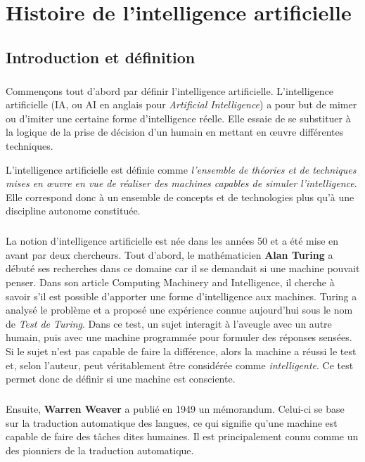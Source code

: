 \section{Histoire de l'intelligence artificielle}
\subsection{Introduction et définition}

\subparagraph{}
Commençons tout d’abord par définir l’intelligence artificielle. L'intelligence artificielle (IA, ou AI en anglais pour \textit{Artificial Intelligence}) a pour but de mimer ou d’imiter une certaine forme d’intelligence réelle. Elle essaie de se substituer à la logique de la prise de décision d’un humain en mettant en œuvre différentes techniques.

L'intelligence artificielle est définie comme \textit{l'ensemble de théories et de techniques mises en œuvre en vue de réaliser des machines capables de simuler l'intelligence}. 
Elle correspond donc à un ensemble de concepts et de technologies plus qu'à une discipline autonome constituée.

\subparagraph{}
La notion d’intelligence artificielle est née dans les années 50 et a été mise en avant par deux chercheurs.
Tout d’abord, le mathématicien \textbf{Alan Turing} a débuté ses recherches dans ce domaine car il se demandait si une machine pouvait penser.
Dans son article Computing Machinery and Intelligence, il cherche à savoir s’il est possible d’apporter une forme d'intelligence aux machines.
Turing a analysé le problème et a proposé une expérience connue aujourd’hui sous le nom de \textit{Test de Turing}. 
Dans ce test, un sujet interagit à l'aveugle avec un autre humain, puis avec une machine programmée pour formuler des réponses sensées. Si le sujet n'est pas capable de faire la différence, alors la machine a réussi le test et, selon l'auteur, peut véritablement être considérée comme \textit{intelligente}.
Ce test permet donc de définir si une machine est consciente.

\subparagraph{}
Ensuite, \textbf{Warren Weaver} a publié en 1949 un mémorandum. Celui-ci se base sur la traduction automatique des langues, ce qui signifie qu’une machine est capable de faire des tâches dites humaines.
Il est principalement connu comme un des pionniers de la traduction automatique.

